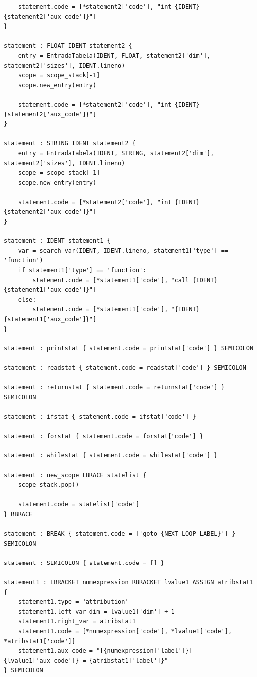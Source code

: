 \documentclass[
	12pt,				%
	openright,			%
	twoside,			%
	a4paper,			%
	english,			%
	french,				%
	spanish,			%
	brazil				%
	]{abntex2}
\begin{document}
\begin{apendicesenv}
\begin{lstlisting}
    statement.code = [*statement2['code'], "int {IDENT}{statement2['aux_code']}"]
}

statement : FLOAT IDENT statement2 {
    entry = EntradaTabela(IDENT, FLOAT, statement2['dim'], statement2['sizes'], IDENT.lineno)
    scope = scope_stack[-1]
    scope.new_entry(entry)

    statement.code = [*statement2['code'], "int {IDENT}{statement2['aux_code']}"]
}

statement : STRING IDENT statement2 {
    entry = EntradaTabela(IDENT, STRING, statement2['dim'], statement2['sizes'], IDENT.lineno)
    scope = scope_stack[-1]
    scope.new_entry(entry)

    statement.code = [*statement2['code'], "int {IDENT}{statement2['aux_code']}"]
}

statement : IDENT statement1 {
    var = search_var(IDENT, IDENT.lineno, statement1['type'] == 'function')
    if statement1['type'] == 'function':
        statement.code = [*statement1['code'], "call {IDENT}{statement1['aux_code']}"]
    else:
        statement.code = [*statement1['code'], "{IDENT}{statement1['aux_code']}"]
}

statement : printstat { statement.code = printstat['code'] } SEMICOLON

statement : readstat { statement.code = readstat['code'] } SEMICOLON

statement : returnstat { statement.code = returnstat['code'] } SEMICOLON

statement : ifstat { statement.code = ifstat['code'] }

statement : forstat { statement.code = forstat['code'] }

statement : whilestat { statement.code = whilestat['code'] }

statement : new_scope LBRACE statelist {
    scope_stack.pop()

    statement.code = statelist['code']
} RBRACE

statement : BREAK { statement.code = ['goto {NEXT_LOOP_LABEL}'] } SEMICOLON

statement : SEMICOLON { statement.code = [] }

statement1 : LBRACKET numexpression RBRACKET lvalue1 ASSIGN atribstat1 { 
    statement1.type = 'attribution'
    statement1.left_var_dim = lvalue1['dim'] + 1
    statement1.right_var = atribstat1
    statement1.code = [*numexpression['code'], *lvalue1['code'], *atribstat1['code']]
    statement1.aux_code = "[{numexpression['label']}]{lvalue1['aux_code']} = {atribstat1['label']}"
} SEMICOLON


\end{lstlisting}
\end{apendicesenv}
\end{document}

